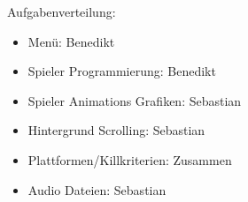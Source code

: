 \documentclass[Skript.tex]{subfiles}
\begin{document}
Aufgabenverteilung:

\begin{itemize}
\item Menü: Benedikt
\item Spieler Programmierung: Benedikt
\item Spieler Animations Grafiken:  Sebastian
\item Hintergrund Scrolling: Sebastian
\item Plattformen/Killkriterien: Zusammen
\item Audio Dateien: Sebastian

\end{itemize}
\end{document}
